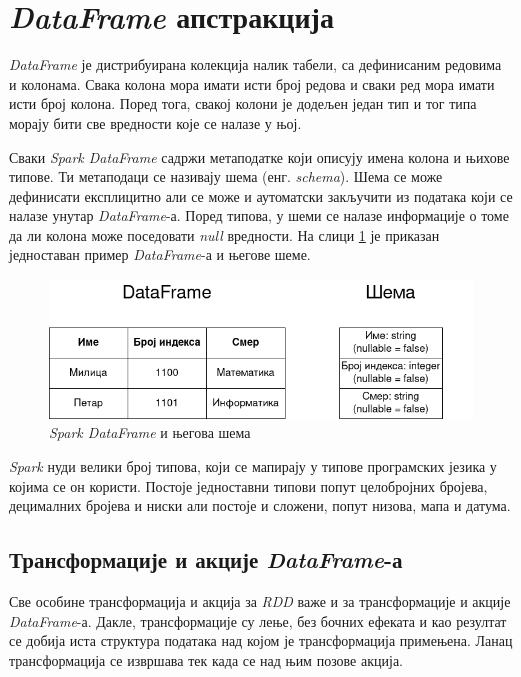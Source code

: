 \documentclass[12pt,oneside]{memoir}
\begin{document}
\section{\textit{DataFrame} апстракција}
\label{sec:spark_df}

\textit{DataFrame} је дистрибуирана колекција налик табели, са дефинисаним редовима и колонама. Свака колона мора имати исти број редова и сваки ред мора имати исти број колона. Поред тога, свакој колони је додељен један тип и тог типа морају бити све вредности које се налазе у њој. \cite{spark_guide}

Сваки \textit{Spark DataFrame} садржи метаподатке који описују имена колона и њихове типове. Ти метаподаци се називају шема (енг. \textit{schema}). Шема се може дефинисати експлицитно али се може и аутоматски закључити из података који се налазе унутар \textit{DataFrame}-а. Поред типова, у шеми се налазе информације о томе да ли колона може поседовати \textit{null} вредности. На слици \ref{fig:sprk_df_schema_example} је приказан једноставан пример \textit{DataFrame}-а и његове шеме. \cite{spark_guide}

\begin{figure}[!ht]
  \centering
  \includegraphics[width=1\textwidth]{pictures/dataframe_schema.png}
  \caption{\textit{Spark DataFrame} и његова шема}
  \label{fig:sprk_df_schema_example}
\end{figure}

\textit{Spark} нуди велики број типова, који се мапирају у типове програмских језика у којима се он користи. Постоје једноставни типови попут целобројних бројева, децималних бројева и ниски али постоје и сложени, попут низова, мапа и датума. \cite{spark_guide}

\subsection{Трансформације и акције \textit{DataFrame}-а}
\label{subsec:spark_sql_ac_tr}

Све особине трансформација и акција за \textit{RDD} важе и за трансформације и акције \textit{DataFrame}-а. Дакле, трансформације су лење, без бочних ефеката и као резултат се добија иста структура података над којом је трансформација примењена. Ланац трансформација се извршава тек када се над њим позове акција.
\end{document}
